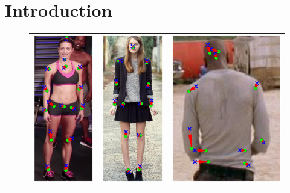 
\section{Introduction}



\setlength{\tabcolsep}{1pt}
\begin{figure}[t!]
        \begin{tabular}{ccc}
        \includegraphics[height=.65\columnwidth]{resources/Annotation_Correction/MotivativeAnnotation/MPII}
        &
        \includegraphics[height=.65\columnwidth]{resources/Annotation_Correction/MotivativeAnnotation/FashionPose}
        &
        \includegraphics[trim=50 0 50 0,clip,height=.65\columnwidth]{resources/Annotation_Correction/MotivativeAnnotation/FLIC}

\end{tabular}
\end{figure}
